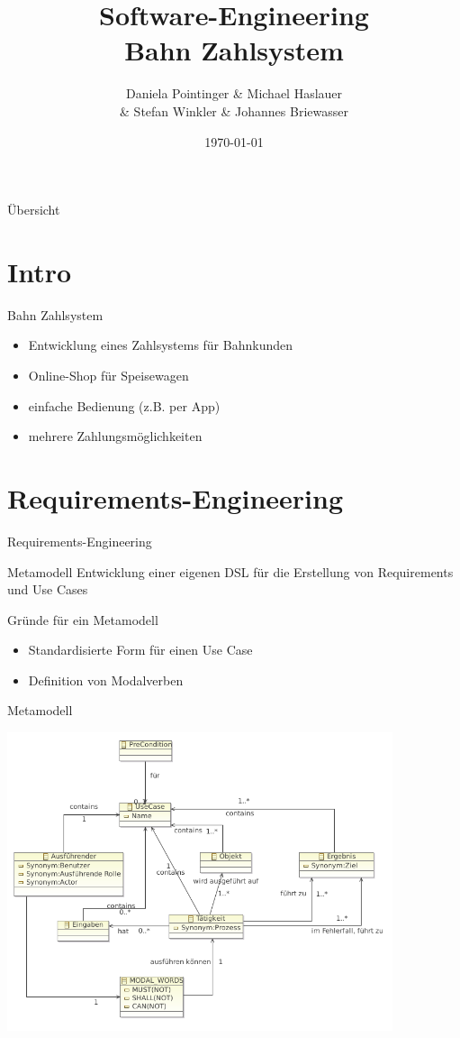 \documentclass{beamer}
\title[]{Software-Engineering\\Bahn Zahlsystem}
\author{Daniela Pointinger \& Michael Haslauer \\\& Stefan Winkler \& Johannes Briewasser}
\institute{FH-Salzburg, Studiengang ITSB-M}
\date{\today}
\begin{document}
\begin{frame}
	\titlepage
\end{frame}

\begin{frame}{Übersicht}
	\tableofcontents
\end{frame}

\section{Intro}
\begin{frame}{Bahn Zahlsystem}
	\begin{itemize}
		\item Entwicklung eines Zahlsystems für Bahnkunden
		\item Online-Shop für Speisewagen
		\item einfache Bedienung (z.B. per App)
		\item mehrere Zahlungsmöglichkeiten
	\end{itemize}
\end{frame}

\section{Requirements-Engineering}
\begin{frame}{Requirements-Engineering}
	\begin{block}{Metamodell}
		Entwicklung einer eigenen DSL für die Erstellung von Requirements und Use Cases
	\end{block}
	
	\begin{block}{Gründe für ein Metamodell}
	\begin{itemize}
		\item Standardisierte Form für einen Use Case
		\item Definition von Modalverben
	\end{itemize}
	\end{block}
\end{frame}

\begin{frame}{Metamodell}
	\begin{center}
		\includegraphics[width=0.85\textwidth]{img/metamodell.png}
	\end{center}
\end{frame}
\end{document}
